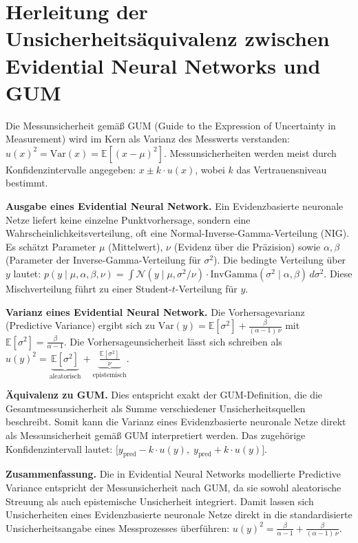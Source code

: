 \pagebreak

\section*{Herleitung der Unsicherheitsäquivalenz zwischen Evidential Neural Networks und GUM}
\label{sec:enn_gum_derivation}

Die Messunsicherheit gemäß GUM (Guide to the Expression of Uncertainty in Measurement) wird im Kern als Varianz des Messwerts verstanden: $u(x)^2 = \mathrm{Var}(x) = \mathbb{E}[(x - \mu)^2]$. Messunsicherheiten werden meist durch Konfidenzintervalle angegeben: $x \pm k \cdot u(x)$, wobei $k$ das Vertrauensniveau bestimmt.

\textbf{Ausgabe eines Evidential Neural Network.} Ein \gls{Evidenzbasierte neuronale Netze} liefert keine einzelne Punktvorhersage, sondern eine Wahrscheinlichkeitsverteilung, oft eine Normal-Inverse-Gamma-Verteilung (NIG). Es schätzt Parameter $\mu$ (Mittelwert), $\nu$ (Evidenz über die Präzision) sowie $\alpha, \beta$ (Parameter der Inverse-Gamma-Verteilung für $\sigma^2$). Die bedingte Verteilung über $y$ lautet: $p(y \mid \mu, \alpha, \beta, \nu) = \int \mathcal{N}(y \mid \mu, \sigma^2/\nu) \cdot \mathrm{InvGamma}(\sigma^2 \mid \alpha, \beta)\, d\sigma^2$. Diese Mischverteilung führt zu einer Student-$t$-Verteilung für $y$.

\textbf{Varianz eines Evidential Neural Network.} Die Vorhersagevarianz (Predictive Variance) ergibt sich zu $\mathrm{Var}(y) = \mathbb{E}[\sigma^2] + \frac{\beta}{(\alpha - 1)\, \nu}$ mit $\mathbb{E}[\sigma^2] = \frac{\beta}{\alpha - 1}$. Die Vorhersageunsicherheit lässt sich schreiben als $u(y)^2 = \underbrace{\mathbb{E}[\sigma^2]}_{\text{aleatorisch}} + \underbrace{\frac{\mathbb{E}[\sigma^2]}{\nu}}_{\text{epistemisch}}$.

\textbf{Äquivalenz zu GUM.} Dies entspricht exakt der GUM-Definition, die die Gesamtmessunsicherheit als Summe verschiedener Unsicherheitsquellen beschreibt. Somit kann die Varianz eines \gls{Evidenzbasierte neuronale Netze} direkt als Messunsicherheit gemäß GUM interpretiert werden. Das zugehörige Konfidenzintervall lautet: $\bigl[y_\text{pred} - k \cdot u(y), \; y_\text{pred} + k \cdot u(y)\bigr]$.

\textbf{Zusammenfassung.} Die in Evidential Neural Networks modellierte Predictive Variance entspricht der Messunsicherheit nach GUM, da sie sowohl aleatorische Streuung als auch epistemische Unsicherheit integriert. Damit lassen sich Unsicherheiten eines \gls{Evidenzbasierte neuronale Netze} direkt in die standardisierte Unsicherheitsangabe eines Messprozesses überführen: $u(y)^2 = \frac{\beta}{\alpha - 1} + \frac{\beta}{(\alpha - 1)\, \nu}$.
